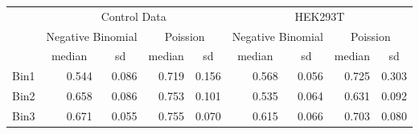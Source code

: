 \begin{table}[H]
\begin{tabular}{@{}|l|crrr|crrr|@{}}
\toprule
\multirow{3}{*}{} & \multicolumn{4}{c|}{Control Data}                                                                                & \multicolumn{4}{c|}{HEK293T}                                                                                     \\ \cmidrule(l){2-9} 
                  & \multicolumn{2}{c|}{Negative Binomial}                   & \multicolumn{2}{c|}{Poission}                         & \multicolumn{2}{c|}{Negative Binomial}                   & \multicolumn{2}{c|}{Poission}                         \\ \cmidrule(l){2-9} 
                  & \multicolumn{1}{c|}{median} & \multicolumn{1}{c|}{sd}    & \multicolumn{1}{c|}{median} & \multicolumn{1}{c|}{sd} & \multicolumn{1}{c|}{median} & \multicolumn{1}{c|}{sd}    & \multicolumn{1}{c|}{median} & \multicolumn{1}{c|}{sd} \\ \midrule
Bin1              & \multicolumn{1}{r|}{0.544}  & \multicolumn{1}{r|}{0.086} & \multicolumn{1}{r|}{0.719}  & 0.156                   & \multicolumn{1}{r|}{0.568}  & \multicolumn{1}{r|}{0.056} & \multicolumn{1}{r|}{0.725}  & 0.303                   \\ \midrule
Bin2              & \multicolumn{1}{r|}{0.658}  & \multicolumn{1}{r|}{0.086} & \multicolumn{1}{r|}{0.753}  & 0.101                   & \multicolumn{1}{r|}{0.535}  & \multicolumn{1}{r|}{0.064} & \multicolumn{1}{r|}{0.631}  & 0.092                   \\ \midrule
Bin3              & \multicolumn{1}{r|}{0.671} & \multicolumn{1}{r|}{0.055} & \multicolumn{1}{r|}{0.755}  & 0.070                   & \multicolumn{1}{r|}{0.615}  & \multicolumn{1}{r|}{0.066} & \multicolumn{1}{r|}{0.703}  & 0.080                   \\ \bottomrule
\end{tabular}
\end{table}